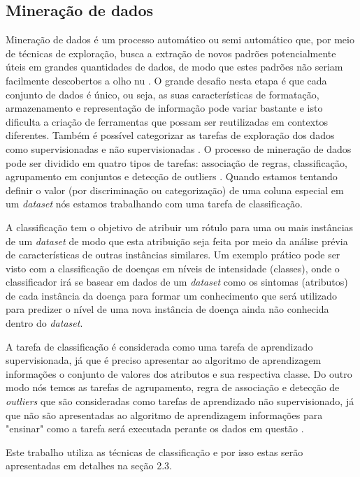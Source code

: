 \subsection{Mineração de dados}

Mineração de dados é um processo automático ou semi automático que, por meio de técnicas de exploração, busca a extração de novos padrões potencialmente úteis em grandes quantidades de dados, de modo que estes padrões não seriam facilmente descobertos a olho nu \cite{Fayyad1996,Witten2016}. O grande desafio nesta etapa é que cada conjunto de dados é único, ou seja, as suas características de formatação, armazenamento e representação de informação pode variar bastante e isto dificulta a criação de ferramentas que possam ser reutilizadas em contextos diferentes. Também é possível categorizar  as tarefas de exploração dos dados como supervisionadas e não supervisionadas \cite{Aggarwal2015}. O processo de mineração de dados pode ser dividido em quatro tipos de tarefas: associação de regras, classificação, agrupamento em conjuntos e  detecção de outliers \cite{Aggarwal2015}. Quando estamos tentando definir o valor (por discriminação ou categorização) de uma coluna especial em um \emph{dataset} nós estamos trabalhando com uma tarefa de classificação.

A classificação tem o objetivo de atribuir um rótulo para uma ou mais instâncias de um \emph{dataset} de modo que esta atribuição seja feita por meio da análise prévia de características de outras instâncias similares. Um exemplo prático pode ser visto com a classificação de doenças em níveis de intensidade (classes), onde o classificador irá se basear em dados de um \emph{dataset} como os sintomas (atributos) de cada instância da doença para formar um conhecimento que será utilizado para predizer o nível de uma nova instância de doença ainda não conhecida dentro do \emph{dataset}.

A tarefa de classificação é considerada como uma tarefa de aprendizado supervisionada, já que é preciso apresentar ao algoritmo de aprendizagem informações o conjunto de valores dos atributos e sua respectiva classe. Do outro modo nós temos as tarefas de agrupamento, regra de associação e detecção de \emph{outliers} que são consideradas como tarefas de aprendizado não supervisionado, já que não são apresentadas ao algoritmo de aprendizagem informações para "ensinar" como a tarefa será executada perante os dados em questão \cite{Aggarwal2015}.

Este trabalho utiliza as técnicas de classificação e por isso estas serão apresentadas em detalhes na seção 2.3.


